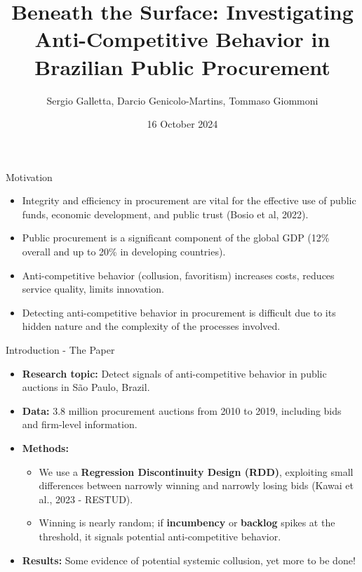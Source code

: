 \documentclass[12pt,english,xcolor=dvipsnames,aspectratio=1610]{beamer}
\title{Beneath the Surface: Investigating Anti-Competitive Behavior in Brazilian Public Procurement}
\author{Sergio Galletta, Darcio Genicolo-Martins, Tommaso Giommoni}
\institute{ETH Zürich, INSPER, University of Amsterdam}
\date{16 October 2024}
\begin{document}
\begin{frame}
    \titlepage
\end{frame}

\begin{frame}{Motivation}
    \begin{itemize}
        \item Integrity and efficiency in procurement are vital for the effective use of public funds, economic development, and public trust (Bosio et al, 2022).\vspace{2mm}
        \item Public procurement is a significant component of the global GDP (12\% overall and up to 20\% in developing countries).\vspace{2mm}
        \item Anti-competitive behavior (collusion, favoritism) increases costs, reduces service quality, limits innovation.\vspace{2mm}
        \item Detecting anti-competitive behavior in procurement is difficult due to its hidden nature and the complexity of the processes involved. \vspace{2mm}
    \end{itemize}
\end{frame}

\begin{frame}{Introduction - The Paper}
\begin{itemize}
\item \textbf{Research topic:} Detect signals of anti-competitive behavior in public auctions in São Paulo, Brazil. \\ \vspace{2mm} \pause
\item \textbf{Data:} 3.8 million procurement auctions from 2010 to 2019, including bids and firm-level information. \\ \vspace{2mm} \pause
\item \textbf{Methods:} \\ \vspace{2mm}
\begin{itemize}
\item [-] We use a \textbf{Regression Discontinuity Design (RDD)}, exploiting small differences between narrowly winning and narrowly losing bids (Kawai et al., 2023 - RESTUD). \\ \vspace{2mm}
\item [-] Winning is nearly random; if \textbf{incumbency} or \textbf{backlog} spikes at the threshold, it signals potential anti-competitive behavior. \pause \\ \vspace{2mm}
\end{itemize}
\item \textbf{Results:} Some evidence of potential systemic collusion, yet more to be done! 
\end{itemize}
\end{frame}
\end{document}
